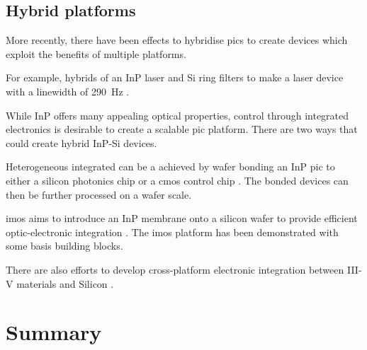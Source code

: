 \subsection{Hybrid platforms}

More recently, there have been effects to hybridise \acp{pic} to create devices which exploit the benefits of multiple platforms. 

For example, hybrids of an \ac{InP} laser and Si ring filters to make a laser device with a linewidth of \SI{290}{Hz} \cite{Fan2017}.

While \ac{InP} offers many appealing optical properties, control through integrated electronics is desirable to create a scalable \ac{pic} platform. There are two ways that could create hybrid \ac{InP}-Si devices. 

Heterogeneous integrated can be a achieved by wafer bonding an \ac{InP} \ac{pic} to either a silicon photonics chip or a \ac{cmos} control chip \cite{jeppix}. The bonded devices can then be further processed on a wafer scale.

\Ac{imos} aims to introduce an \ac{InP} membrane onto a silicon wafer to provide efficient optic-electronic integration \cite{jeppix}. The \ac{imos} platform has been demonstrated with some basis building blocks.

There are also efforts to develop cross-platform electronic integration between III-V materials and Silicon \cite{}. 

\section{Summary}


